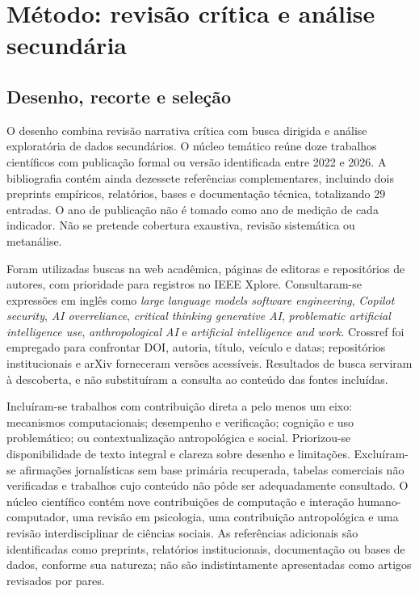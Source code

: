 \documentclass[11pt,a4paper]{article}
\begin{document}
\section{Método: revisão crítica e análise secundária}
\subsection{Desenho, recorte e seleção}
O desenho combina revisão narrativa crítica com busca dirigida e análise exploratória de dados secundários. O núcleo temático reúne doze trabalhos científicos com publicação formal ou versão identificada entre 2022 e 2026. A bibliografia contém ainda dezessete referências complementares, incluindo dois preprints empíricos, relatórios, bases e documentação técnica, totalizando 29 entradas. O ano de publicação não é tomado como ano de medição de cada indicador. Não se pretende cobertura exaustiva, revisão sistemática ou metanálise.

Foram utilizadas buscas na web acadêmica, páginas de editoras e repositórios de autores, com prioridade para registros no IEEE Xplore. Consultaram-se expressões em inglês como \textit{large language models software engineering}, \textit{Copilot security}, \textit{AI overreliance}, \textit{critical thinking generative AI}, \textit{problematic artificial intelligence use}, \textit{anthropological AI} e \textit{artificial intelligence and work}. Crossref foi empregado para confrontar DOI, autoria, título, veículo e datas; repositórios institucionais e arXiv forneceram versões acessíveis. Resultados de busca serviram à descoberta, e não substituíram a consulta ao conteúdo das fontes incluídas.

Incluíram-se trabalhos com contribuição direta a pelo menos um eixo: mecanismos computacionais; desempenho e verificação; cognição e uso problemático; ou contextualização antropológica e social. Priorizou-se disponibilidade de texto integral e clareza sobre desenho e limitações. Excluíram-se afirmações jornalísticas sem base primária recuperada, tabelas comerciais não verificadas e trabalhos cujo conteúdo não pôde ser adequadamente consultado. O núcleo científico contém nove contribuições de computação e interação humano-computador, uma revisão em psicologia, uma contribuição antropológica e uma revisão interdisciplinar de ciências sociais. As referências adicionais são identificadas como preprints, relatórios institucionais, documentação ou bases de dados, conforme sua natureza; não são indistintamente apresentadas como artigos revisados por pares.
\end{document}
